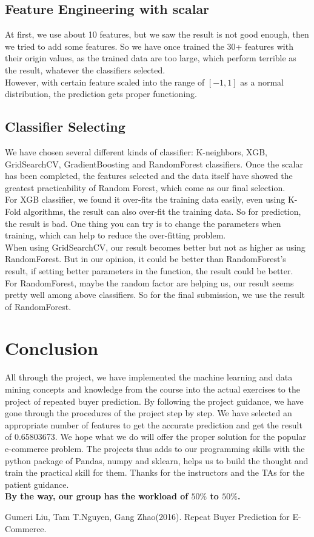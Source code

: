\documentclass[sigconf]{acmart}
\begin{document}
\subsection{Feature Engineering with scalar}
At first, we use about 10 features, but we saw the result is not good enough, then we tried to add some features.
So we have once trained the 30+ features with their origin values, as the trained data are too large, which perform terrible as the result, whatever the classifiers selected. \\
\indent
However, with certain feature scaled into the range of $[-1, 1]$ as a normal distribution, the prediction gets proper functioning.

\subsection{Classifier Selecting}
We have chosen several different kinds of classifier: K-neighbors, XGB, GridSearchCV, GradientBoosting and RandomForest classifiers. Once the scalar has been completed, the features selected and the data itself have showed the greatest practicability of Random Forest, which come as our final selection. \\
\indent
For XGB classifier, we found it over-fits the training data easily, even using K-Fold algorithms, the result can also over-fit the training data. So for prediction, the result is bad. One thing you can try is to change the parameters when training, which can help to reduce the over-fitting problem.\\
\indent
When using GridSearchCV, our result becomes better but not as higher as using RandomForest. But in our opinion, it could be better than RandomForest's result, if setting better parameters in the function, the result could be better.\\
\indent
For RandomForest, maybe the random factor are helping us, our result seems pretty well among above classifiers. So for the final submission, we use the result of RandomForest.


\section{Conclusion}
All through the project, we have implemented the machine learning and data mining concepts and knowledge from the course into the actual exercises to the project of repeated buyer prediction. By following the project guidance, we have gone through the procedures of the project step by step. We have selected an appropriate number of features to get the accurate prediction and get the result of 0.65803673. We hope what we do will offer the proper solution for the popular e-commerce problem. The projects thus adds to our programming skills with the python package of Pandas, numpy and sklearn, helps us to build the thought and train the practical skill for them. Thanks for the instructors and the TAs for the  patient guidance.\\
\indent
\textbf{By the way, our group has the workload of $50\%$ to $50\%$.}

\begin{thebibliography}{99}
 Gumeri Liu, Tam T.Nguyen, Gang Zhao(2016). Repeat Buyer Prediction for E-Commerce.
\end{thebibliography}


\end{document}
